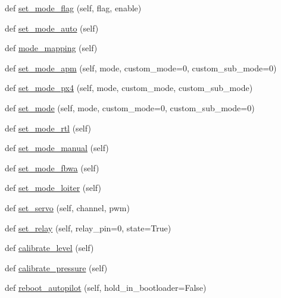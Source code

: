 \begin{DoxyCompactItemize}
\item 
def \hyperlink{classpymavlink_1_1mavutil_1_1mavfile_a67cb3ddd8971781b673bcd676596517c}{set\+\_\+mode\+\_\+flag} (self, flag, enable)
\item 
def \hyperlink{classpymavlink_1_1mavutil_1_1mavfile_a6433a671029040513eb170b3bfd1689a}{set\+\_\+mode\+\_\+auto} (self)
\item 
def \hyperlink{classpymavlink_1_1mavutil_1_1mavfile_a243064da4dc092d07af642404240613b}{mode\+\_\+mapping} (self)
\item 
def \hyperlink{classpymavlink_1_1mavutil_1_1mavfile_a05d005f98f3cbc966f8f00ef013475d5}{set\+\_\+mode\+\_\+apm} (self, mode, custom\+\_\+mode=0, custom\+\_\+sub\+\_\+mode=0)
\item 
def \hyperlink{classpymavlink_1_1mavutil_1_1mavfile_aa555cab4483c90f63af193958fa49204}{set\+\_\+mode\+\_\+px4} (self, mode, custom\+\_\+mode, custom\+\_\+sub\+\_\+mode)
\item 
def \hyperlink{classpymavlink_1_1mavutil_1_1mavfile_a284eb9b6577bb9d50a67f11ce892769f}{set\+\_\+mode} (self, mode, custom\+\_\+mode=0, custom\+\_\+sub\+\_\+mode=0)
\item 
def \hyperlink{classpymavlink_1_1mavutil_1_1mavfile_a6fda4c34e34cccf12e9a34e6103e1678}{set\+\_\+mode\+\_\+rtl} (self)
\item 
def \hyperlink{classpymavlink_1_1mavutil_1_1mavfile_aeff1ba57a638061a1eaca1286d9c5642}{set\+\_\+mode\+\_\+manual} (self)
\item 
def \hyperlink{classpymavlink_1_1mavutil_1_1mavfile_a13249ac76758f732632ebefe026207f3}{set\+\_\+mode\+\_\+fbwa} (self)
\item 
def \hyperlink{classpymavlink_1_1mavutil_1_1mavfile_a93705650b06f0debf62ff0ddc8e1bfee}{set\+\_\+mode\+\_\+loiter} (self)
\item 
def \hyperlink{classpymavlink_1_1mavutil_1_1mavfile_a5dcc6c45753772530e85f70d28407c03}{set\+\_\+servo} (self, channel, pwm)
\item 
def \hyperlink{classpymavlink_1_1mavutil_1_1mavfile_adefc4e0924a50a82a42a49e790cfe19a}{set\+\_\+relay} (self, relay\+\_\+pin=0, state=True)
\item 
def \hyperlink{classpymavlink_1_1mavutil_1_1mavfile_a56b77586434e96ca161d4744104fe313}{calibrate\+\_\+level} (self)
\item 
def \hyperlink{classpymavlink_1_1mavutil_1_1mavfile_af0001f7ae0e3d0e63c592f3ad98740d6}{calibrate\+\_\+pressure} (self)
\item 
def \hyperlink{classpymavlink_1_1mavutil_1_1mavfile_ae1f8a428d88379acbdbdd0bcc0f81106}{reboot\+\_\+autopilot} (self, hold\+\_\+in\+\_\+bootloader=False)

\end{DoxyCompactItemize}
